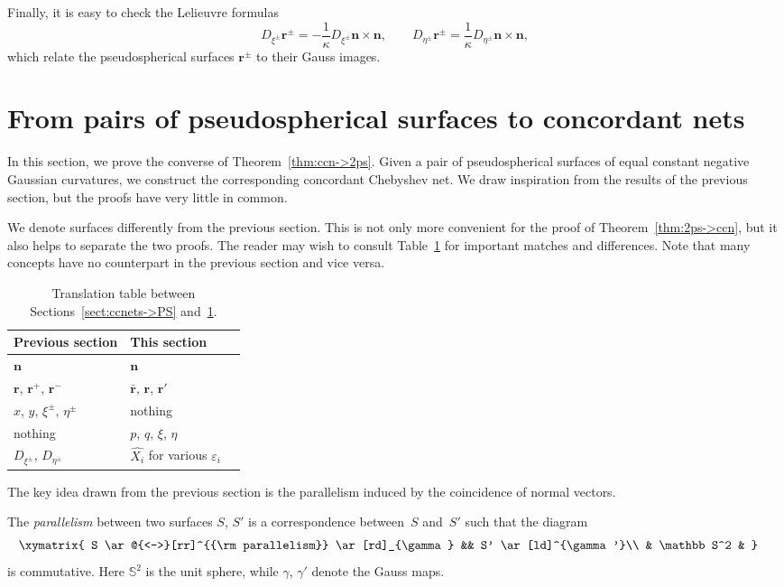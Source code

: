 \documentclass[pdftex]{sigma}
\let\ve\mathbf
\let\epsilon\varepsilon
\def\k{\kappa}
\numberwithin{equation}{section}
\begin{document}
Finally, it is easy to check the Lelieuvre formulas~\cite[equation~(1.140)]{R-S}
\[
D_{\xi^\pm} \ve r^\pm
 = -\frac{1}{\k} D_{\xi^\pm}\ve n \times \ve n,
\qquad
D_{\eta^\pm} \ve r^\pm
 = \frac{1}{\k} D_{\eta^\pm}\ve n \times \ve n,
\]
which relate the pseudospherical surfaces $\ve r^\pm$ to their Gauss images.


\section{From pairs of pseudospherical surfaces to concordant nets}
\label{sect:PS->ccnets}

In this section, we prove the converse of Theorem~\ref{thm:ccn->2ps}.
Given a pair of pseudospherical surfaces
of equal constant negative Gaussian curvatures,
we construct the corresponding concordant Chebyshev net.
We draw inspiration from the results of the previous section,
but the proofs have very little in common.

We denote surfaces differently from the previous section.
This is not only more convenient for the proof of Theorem~\ref{thm:2ps->ccn},
but it also helps to separate the two proofs.
The reader may wish to consult Table~\ref{tab:sect:sect} for important matches and
differences.
Note that many concepts have no counterpart in the previous section and vice versa.
\begin{table}[th]\centering\renewcommand{\arraystretch}{1.2}
\begin{tabular}{lll}
Previous section & This section \\\hline
$\ve n$ & $ \ve n$ \\
$\ve r$, $\ve r^+$, $\ve r^-$ & $\bar{\ve r}$, $\ve r$, $\ve r'$ \\
$x$, $y$, $\xi^\pm$, $\eta^\pm$ & nothing \\
nothing & $p$, $q$, $\xi$, $\eta$ \\
$D_{\xi^\pm}$, $D_{\eta^\pm}$ & $\widehat{X_i}$ for various $\epsilon_i$
\end{tabular}
\caption{Translation table between Sections~\ref{sect:ccnets->PS} and~\ref{sect:PS->ccnets}.}\label{tab:sect:sect}
\end{table}

The key idea drawn from the previous section is the parallelism
induced by the coincidence of normal vectors.

\begin{Definition}
The {\it parallelism} \cite{LPE-1909,WCG-1922,KMP-1866}
between two surfaces $S$, $S'$ is a correspondence between~$S$ and~$S'$
such that the diagram
\begin{gather} \label{eq:diag}
\begin{split}&
\xymatrix{
S \ar@{<->}[rr]^{{\rm parallelism}} \ar[rd]_{\gamma} && S' \ar[ld]^{\gamma'}\\
 & \mathbb S^2 &
}\end{split}
\end{gather}
is commutative.
Here $\mathbb S^2$ is the unit sphere, while $\gamma$, $\gamma'$
denote the Gauss maps.
\end{Definition}
\end{document}
